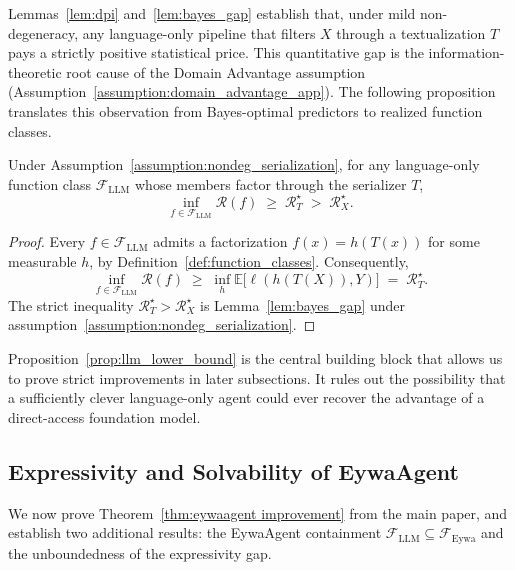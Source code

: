 \documentclass{llmxive}
\begin{document}
{Lemmas~\ref{lem:dpi} and~\ref{lem:bayes_gap} establish that, under mild non-degeneracy, any language-only pipeline that filters $X$ through a textualization $T$ pays a strictly positive statistical price. This quantitative gap is the information-theoretic root cause of the Domain Advantage assumption (Assumption~\ref{assumption:domain_advantage_app}). The following proposition translates this observation from Bayes-optimal predictors to realized function classes.

\begin{proposition}
\label{prop:llm_lower_bound}
Under Assumption~\ref{assumption:nondeg_serialization}, for any language-only function class $\mathcal{F}_{\mathrm{LLM}}$ whose members factor through the serializer $T$,
\begin{equation}
\inf_{f\in\mathcal{F}_{\mathrm{LLM}}}\mathcal{R}(f)\;\ge\;\mathcal{R}_T^\star\;>\;\mathcal{R}_X^\star.
\end{equation}
\end{proposition}
\begin{proof}
Every $f\in\mathcal{F}_{\mathrm{LLM}}$ admits a factorization $f(x)=h(T(x))$ for some measurable $h$, by Definition~\ref{def:function_classes}. Consequently,
\[
\inf_{f\in\mathcal{F}_{\mathrm{LLM}}}\mathcal{R}(f)
\;\ge\;
\inf_{h}\mathbb{E}\big[\ell(h(T(X)),Y)\big]
\;=\;
\mathcal{R}_T^\star.
\]
The strict inequality $\mathcal{R}_T^\star>\mathcal{R}_X^\star$ is Lemma~\ref{lem:bayes_gap} under assumption~\ref{assumption:nondeg_serialization}.
\end{proof}
Proposition~\ref{prop:llm_lower_bound} is the central building block that allows us to prove strict improvements in later subsections. It rules out the possibility that a sufficiently clever language-only agent could ever recover the advantage of a direct-access foundation model.






\subsection{Expressivity and Solvability of EywaAgent}
\label{app:expressivity}

We now prove Theorem~\ref{thm:eywaagent improvement} from the main paper, and establish two additional results: the EywaAgent containment $\mathcal{F}_{\mathrm{LLM}}\subseteq\mathcal{F}_{\mathrm{Eywa}}$ and the unboundedness of the expressivity gap.

}
\end{document}
